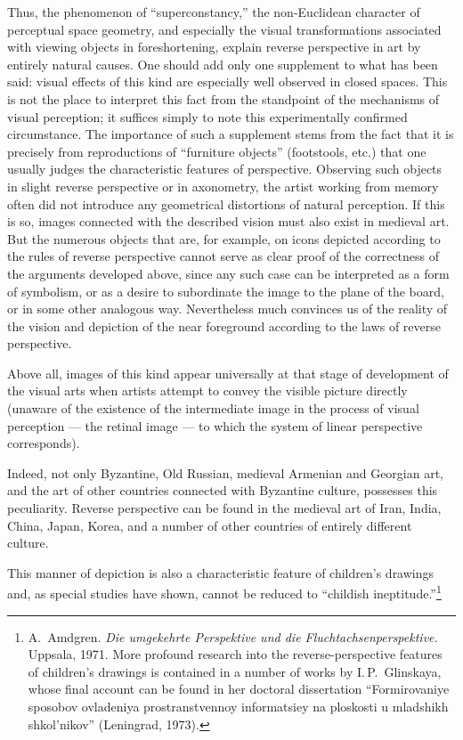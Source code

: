 Thus, the phenomenon of ``superconstancy,'' the non-Euclidean character of perceptual
space geometry, and especially the visual transformations associated with viewing
objects in foreshortening, explain reverse perspective in art by entirely natural
causes.  One should add only one supplement to what has been said: visual effects of
this kind are especially well observed in closed spaces.  This is not the place to
interpret this fact from the standpoint of the mechanisms of visual perception; it
suffices simply to note this experimentally confirmed circumstance.  The importance
of such a supplement stems from the fact that it is precisely from reproductions of
``furniture objects'' (footstools, etc.) that one usually judges the characteristic
features of perspective.  Observing such objects in slight reverse perspective or in
axonometry, the artist working from memory often did not introduce any geometrical
distortions of natural perception.  If this is so, images connected with the
described vision must also exist in medieval art.  But the numerous objects that are,
for example, on icons depicted according to the rules of reverse perspective cannot
serve as clear proof of the correctness of the arguments developed above, since any
such case can be interpreted as a form of symbolism, or as a desire to subordinate
the image to the plane of the board, or in some other analogous way.  Nevertheless
much convinces us of the reality of the vision and depiction of the near foreground
according to the laws of reverse perspective.


Above all, images of this kind appear universally at that stage of development of the
visual arts when artists attempt to convey the visible picture directly (unaware of
the existence of the intermediate image in the process of visual perception --- the
retinal image --- to which the system of linear perspective corresponds).

Indeed, not only Byzantine, Old Russian, medieval Armenian and Georgian art, and the
art of other countries connected with Byzantine culture, possesses this peculiarity.
Reverse perspective can be found in the medieval art of Iran, India, China, Japan,
Korea, and a number of other countries of entirely different culture.

This manner of depiction is also a characteristic feature of children's drawings
and, as special studies have shown, cannot be reduced to ``childish
ineptitude.''\footnote{A.~Amdgren.  \emph{Die umgekehrte Perspektive und die
  Fluchtachsenperspektive.}  Uppsala, 1971.  More profound research into the
  reverse-perspective features of children's drawings is contained in a number of
  works by I.\,P.~Glinskaya, whose final account can be found in her doctoral
  dissertation ``Formirovaniye sposobov ovladeniya prostranstvennoy informatsiey na
  ploskosti u mladshikh shkol'nikov'' (Leningrad, 1973).}

